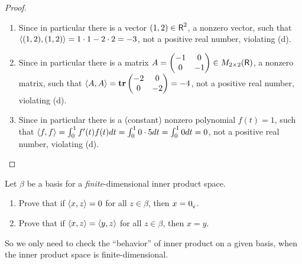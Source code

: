 \begin{proof} \ 

\begin{enumerate}
\item Since in particular there is a vector \((1, 2) \in \textsf{R}^2\), a nonzero vector, such that \(\left< (1, 2), (1, 2) \right> = 1 \cdot 1 - 2 \cdot 2 = -3\), not a positive real number, violating (d).

\item Since in particular there is a matrix \(A = \begin{pmatrix} -1 & 0 \\ 0 & -1 \end{pmatrix} \in M_{2 \times 2}(\textsf{R})\), a nonzero matrix, such that \(\left< A, A \right> = \textbf{tr} \begin{pmatrix} -2 & 0 \\ 0 & -2 \end{pmatrix} = -4\), not a positive real number, violating (d).

\item Since in particular there is a (constant) nonzero polynomial \(f(t) = 1\), such that \(\left< f, f \right> = \int_0^1 f'(t)f(t) dt = \int_0^1 0 \cdot 5 dt = \int_0^1 0 dt = 0\), not a positive real number, violating (d).
\end{enumerate}
\end{proof}

\begin{exercise} \label{exercise 6.1.9}
Let \(\beta\) be a basis for a \emph{finite}-dimensional inner product space.
\begin{enumerate}
\item Prove that if \(\left< x, z \right> = 0\) for all \(z \in \beta\), then \(x = 0_{_{\textsf{V}}}\).
\item Prove that if \(\left< x, z \right> = \left< y, z \right>\) for all \(z \in \beta\), then \(x = y\).
\end{enumerate}
\end{exercise}

\begin{note}
So we only need to check the ``behavior'' of inner product on a given basis, when the inner product space is finite-dimensional.
\end{note}

